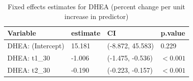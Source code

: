 \begin{table}[!h]
\centering
\caption{Fixed effects estimates for DHEA (percent change per unit increase in predictor)}
\centering
\begin{tabular}[t]{llll}
\toprule
Variable & estimate & CI & p.value\\
\midrule
DHEA: (Intercept) & 15.181 & (-8.872, 45.583) & 0.229\\
DHEA: t1_30 & -1.006 & (-1.475, -0.536) & $<0.001$\\
DHEA: t2_30 & -0.190 & (-0.223, -0.157) & $<0.001$\\
\bottomrule
\end{tabular}
\end{table}
